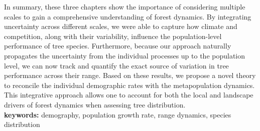 In summary, these three chapters show the importance of considering multiple scales to gain a comprehensive understanding of forest dynamics. By integrating uncertainty across different scales, we were able to capture how climate and competition, along with their variability, influence the population-level performance of tree species. Furthermore, because our approach naturally propagates the uncertainty from the individual processes up to the population level, we can now track and quantify the exact source of variation in tree performance across their range. Based on these results, we propose a novel theory to reconcile the individual demographic rates with the metapopulation dynamics. This integrative approach allows one to account for both the local and landscape drivers of forest dynamics when assessing tree distribution.\\

\textbf{keywords:} demography, population growth rate, range dynamics, species distribution
